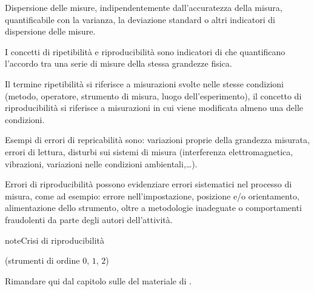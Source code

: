 \documentclass[letterpaper,10pt,italian]{jupyterBook}
\begin{document}
\sphinxAtStartPar
{} Dispersione delle misure, indipendentemente dall’accuratezza della misura, quantificabile con la varianza, la deviazione standard o altri indicatori di dispersione delle misure.

\sphinxAtStartPar
{} I concetti di ripetibilità e riproducibilità sono indicatori di  che quantificano l’accordo tra una serie di misure della stessa grandezze fisica.

\sphinxAtStartPar
Il termine ripetibilità si riferisce a misurazioni svolte nelle stesse condizioni (metodo, operatore, strumento di misura, luogo dell’esperimento), il concetto di riproducibilità si riferisce a misurazioni in cui viene modificata almeno una delle condizioni.

\sphinxAtStartPar
Esempi di errori di repricabilità sono: variazioni proprie della grandezza misurata, errori di lettura, disturbi sui sistemi di misura (interferenza elettromagnetica, vibrazioni, variazioni nelle condizioni ambientali,…).

\sphinxAtStartPar
Errori di riproducibilità possono evidenziare errori sistematici nel processo di misura, come ad esempio: errore nell’impostazione, posizione e/o orientamento, alimentazione dello strumento, oltre a metodologie inadeguate o comportamenti fraudolenti da parte degli autori dell’attività.

\begin{sphinxadmonition}{note}{Crisi di riproducibilità}



\sphinxAtStartPar
{}
\end{sphinxadmonition}

\sphinxAtStartPar
{}

\sphinxAtStartPar
{}

\sphinxAtStartPar
{}

\sphinxAtStartPar
{}

\sphinxAtStartPar
{} (strumenti di ordine \(0\), \(1\), \(2\))

\sphinxAtStartPar
Rimandare qui dal capitolo sulle  del materiale di .
 \label{exercise:instrument-order-zero-exercise}
\end{document}
